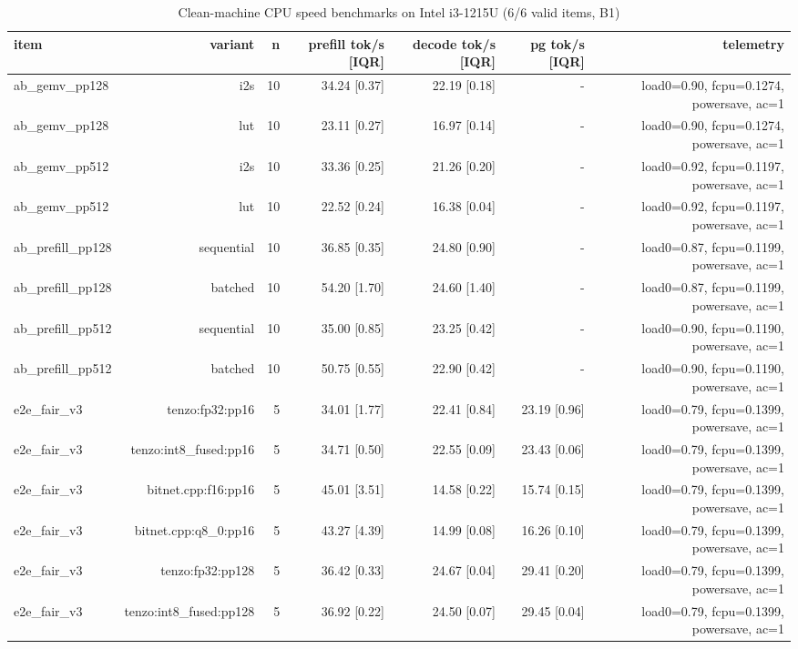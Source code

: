 \begin{table}[t]\centering\small
\caption{Clean-machine CPU speed benchmarks on Intel i3-1215U (6/6 valid items, B1)}
\begin{tabular}{lrrrrrr}\toprule
item & variant & n & prefill tok/s [IQR] & decode tok/s [IQR] & pg tok/s [IQR] & telemetry \\ \midrule
ab\_gemv\_pp128 & i2s & 10 & 34.24 [0.37] & 22.19 [0.18] & - & load0=0.90, fcpu=0.1274, powersave, ac=1 \\
ab\_gemv\_pp128 & lut & 10 & 23.11 [0.27] & 16.97 [0.14] & - & load0=0.90, fcpu=0.1274, powersave, ac=1 \\
ab\_gemv\_pp512 & i2s & 10 & 33.36 [0.25] & 21.26 [0.20] & - & load0=0.92, fcpu=0.1197, powersave, ac=1 \\
ab\_gemv\_pp512 & lut & 10 & 22.52 [0.24] & 16.38 [0.04] & - & load0=0.92, fcpu=0.1197, powersave, ac=1 \\
ab\_prefill\_pp128 & sequential & 10 & 36.85 [0.35] & 24.80 [0.90] & - & load0=0.87, fcpu=0.1199, powersave, ac=1 \\
ab\_prefill\_pp128 & batched & 10 & 54.20 [1.70] & 24.60 [1.40] & - & load0=0.87, fcpu=0.1199, powersave, ac=1 \\
ab\_prefill\_pp512 & sequential & 10 & 35.00 [0.85] & 23.25 [0.42] & - & load0=0.90, fcpu=0.1190, powersave, ac=1 \\
ab\_prefill\_pp512 & batched & 10 & 50.75 [0.55] & 22.90 [0.42] & - & load0=0.90, fcpu=0.1190, powersave, ac=1 \\
e2e\_fair\_v3 & tenzo:fp32:pp16 & 5 & 34.01 [1.77] & 22.41 [0.84] & 23.19 [0.96] & load0=0.79, fcpu=0.1399, powersave, ac=1 \\
e2e\_fair\_v3 & tenzo:int8\_fused:pp16 & 5 & 34.71 [0.50] & 22.55 [0.09] & 23.43 [0.06] & load0=0.79, fcpu=0.1399, powersave, ac=1 \\
e2e\_fair\_v3 & bitnet.cpp:f16:pp16 & 5 & 45.01 [3.51] & 14.58 [0.22] & 15.74 [0.15] & load0=0.79, fcpu=0.1399, powersave, ac=1 \\
e2e\_fair\_v3 & bitnet.cpp:q8\_0:pp16 & 5 & 43.27 [4.39] & 14.99 [0.08] & 16.26 [0.10] & load0=0.79, fcpu=0.1399, powersave, ac=1 \\
e2e\_fair\_v3 & tenzo:fp32:pp128 & 5 & 36.42 [0.33] & 24.67 [0.04] & 29.41 [0.20] & load0=0.79, fcpu=0.1399, powersave, ac=1 \\
e2e\_fair\_v3 & tenzo:int8\_fused:pp128 & 5 & 36.92 [0.22] & 24.50 [0.07] & 29.45 [0.04] & load0=0.79, fcpu=0.1399, powersave, ac=1 \\

\end{tabular}
\end{table}
